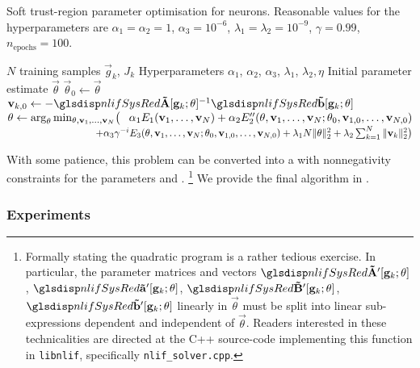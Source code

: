 \begin{algorithm}[p]
	\caption{Soft trust-region parameter optimisation for \nlif neurons.
	Reasonable values for the hyperparameters are $\alpha_1 = \alpha_2 = 1$, $\alpha_3 = 10^{-6}$, $\lambda_1 = \lambda_2 = 10^{-9}$, $\gamma = 0.99$, $n_\mathrm{epochs} = 100$.
	}
	\label{alg:nlif_tr_parameters}
	\begin{algorithmic}\sffamily\small
	\Require $N$ training samples $\vec g_k$, $J_k$
	\Require Hyperparameters $\alpha_1$, $\alpha_2$, $\alpha_3$, $\lambda_1$, $\lambda_2, \eta$
	\Require Initial parameter estimate $\vec \theta$
		\State $\vec \theta_0 \gets \vec \theta$
			\State $\vec v_{k, 0} \gets -\mrA[\vec g_k; \vec \theta]^{-1} \vrb[\vec g_k; \vec \theta]$
		\EndFor
		\State $
			\vec \theta \gets
			\arg_{\vec \theta}\min_{\vec \theta, \vec v_1, \ldots, \vec v_N}
				\bigl( \hphantom{+} \alpha_1 E_1(\vec v_1, \ldots, \vec v_{N})
			+ \alpha_2 E_2''(\vec \theta, \vec v_1, \ldots, \vec v_N; \vec \theta_0, \vec v_{1,0}, \ldots, \vec v_{N, 0})$
		\State $\hspace{8.9em} + \alpha_3 \gamma^{-i} E_3(\vec \theta, \vec v_1, \ldots, \vec v_N; \vec \theta_0, \vec v_{1,0}, \ldots, \vec v_{N, 0}) + \lambda_1 N \|\vec \theta\|_2^2 + \lambda_2 \sum_{k = 1}^N \| \vec v_{k} \|_2^2 \bigr)$
	\EndFor
	\end{algorithmic}
\end{algorithm}

With some patience, this problem can be converted into a  with nonnegativity constraints for the parameters \vrap and \mrAp.%
\footnote{
Formally stating the quadratic program is a rather tedious exercise.
In particular, the parameter matrices and vectors $\mrAp[\vec g_k; \vec \theta]$, $\vrap[\vec g_k; \vec \theta]$, $\mrBp[\vec g_k; \vec \theta]$, $\vrbp[\vec g_k; \vec \theta]$ linearly in $\vec \theta$ must be split into linear sub-expressions dependent and independent of $\vec \theta$.
Readers interested in these technicalities are directed at the C++ source-code implementing this function in \texttt{libnlif}, specifically \texttt{nlif\_solver.cpp}.
}
We provide the final algorithm in .

\subsubsection{Experiments}